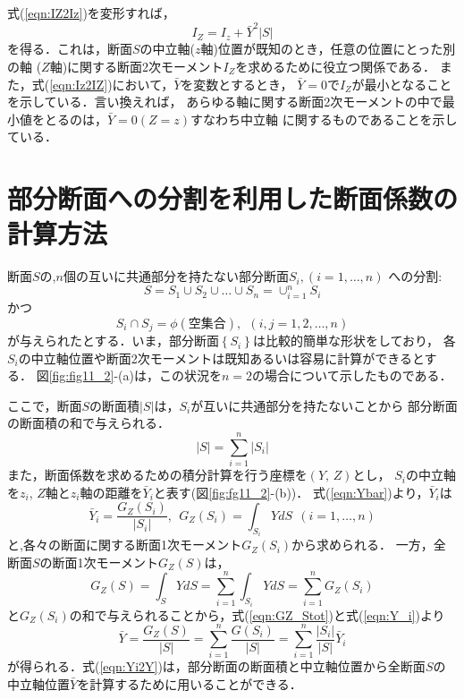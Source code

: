 \documentclass[10pt,a4j]{jarticle}
\begin{document}
式(\ref{eqn:IZ2Iz})を変形すれば，
\begin{equation}
	I_Z=I_z+\bar Y^2 \left| S \right|
	\label{eqn:Iz2IZ}
\end{equation}
を得る．これは，断面$S$の中立軸($z$軸)位置が既知のとき，任意の位置にとった別の軸
($Z$軸)に関する断面2次モーメント$I_Z$を求めるために役立つ関係である．
また，式(\ref{eqn:Iz2IZ})において，$\bar{Y}$を変数とするとき，
$\bar{Y}=0$で$I_Z$が最小となることを示している．言い換えれば，
あらゆる軸に関する断面2次モーメントの中で最小値をとるのは，$\bar Y=0 (Z=z)$すなわち中立軸
に関するものであることを示している．
\section{部分断面への分割を利用した断面係数の計算方法}
断面$S$の,$n$個の互いに共通部分を持たない部分断面$S_i, (i=1,\dots, n)$
への分割:
\begin{equation}
	S=S_1\cup S_2 \cup \dots \cup S_n=\cup_{i=1}^n S_i
	\label{eqn:cup_Si}
\end{equation}
かつ
\begin{equation}
	S_i \cap S_j =\phi(空集合), \ \ (i,j=1,2,\dots ,n ) 
	\label{eqn:cap_Si}
\end{equation}
が与えられたとする．いま，部分断面$\left\{ S_i \right\}$は比較的簡単な形状をしており，
各$S_i$の中立軸位置や断面2次モーメントは既知あるいは容易に計算ができるとする．
図\ref{fig:fig11_2}-(a)は，この状況を$n=2$の場合について示したものである．


ここで，断面$S$の断面積$\left| S \right|$は，$S_i$が互いに共通部分を持たないことから
部分断面の断面積の和で与えられる．
\begin{equation}
	\left|S\right| = \sum_{i=1}^n \left| S_i \right|
	\label{eqn:Stot}
\end{equation}
また，断面係数を求めるための積分計算を行う座標を$(Y,\,Z)$とし，
$S_i$の中立軸を$z_i$, $Z$軸と$z_i$軸の距離を$\bar Y_i$と表す(図\ref{fig:fg11_2}-(b))．
式(\ref{eqn:Ybar})より，$\bar Y_i$は
\begin{equation}
	\bar{Y}_i = \frac{G_Z(S_i)}{\left| S_i \right|}, 
	\ \ G_Z(S_i)=\int_{S_i}YdS
\ \ (i=1,\dots,n)
	\label{eqn:Y_i}
\end{equation}
と,各々の断面に関する断面1次モーメント$G_Z(S_i)$から求められる．
一方，全断面$S$の断面1次モーメント$G_Z(S)$は，
\begin{equation}
	G_Z(S)=\int_SYdS
	=\sum_{i=1}^n \int_{S_i} YdS
	=\sum_{i=1}^n G_Z(S_i)
	\label{eqn:GZ_Stot}
\end{equation}
と$G_Z(S_i)$の和で与えられることから，式(\ref{eqn:GZ_Stot})と式(\ref{eqn:Y_i})より
\begin{equation}
	\bar Y 
	= \frac{G_Z(S)}{\left| S \right|}
	= \sum_{i=1}^n \frac{G(S_i)}{\left| S \right|}
	= \sum_{i=1}^n \frac{\left| S_i\right|}{\left| S \right|}\bar{Y}_i
	\label{eqn:Yi2Y}
\end{equation}
が得られる．式(\ref{eqn:Yi2Y})は，部分断面の断面積と中立軸位置から全断面$S$の
中立軸位置$\bar Y$を計算するために用いることができる．
\end{document}
